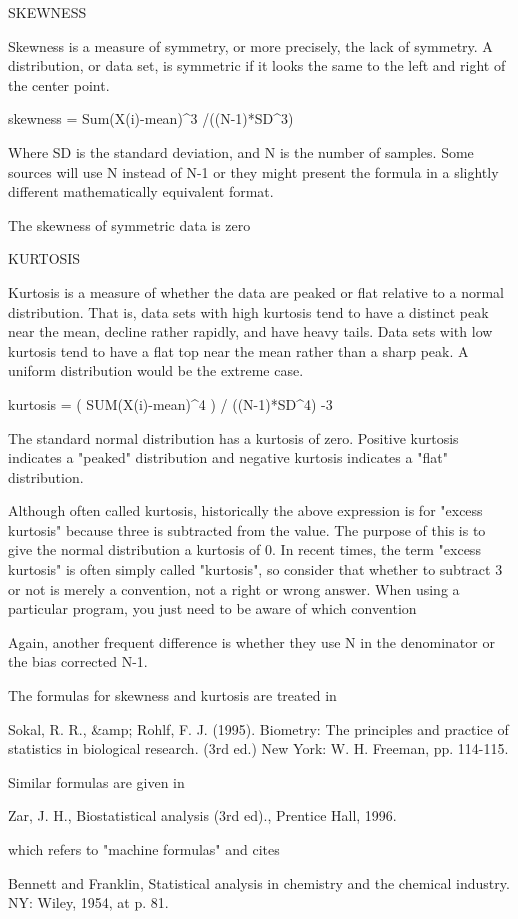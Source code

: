 S\+K\+E\+W\+N\+E\+SS \begin{DoxyVerb}   Skewness is a measure of symmetry, or more
   precisely, the lack of symmetry. A distribution, or
   data set, is symmetric if it looks the same to the left
   and right of the center point.

      skewness = Sum{(X(i)-mean)^3} /((N-1)*SD^3)

   Where SD is the standard deviation, and N is the number of
   samples. Some sources will use N instead of N-1 or they might
   present the formula in a slightly different mathematically
   equivalent format.

      The skewness of symmetric data is zero
\end{DoxyVerb}


K\+U\+R\+T\+O\+S\+IS \begin{DoxyVerb}   Kurtosis is a measure of whether the data are peaked
   or flat relative to a normal distribution. That is,
   data sets with high kurtosis tend to have a distinct
   peak near the mean, decline rather rapidly, and have
   heavy tails. Data sets with low kurtosis tend to have a
   flat top near the mean rather than a sharp peak. A
   uniform distribution would be the extreme case.

      kurtosis = ( SUM{(X(i)-mean)^4} ) / ((N-1)*SD^4) -3

   The standard normal distribution has a kurtosis of
   zero. Positive kurtosis indicates a "peaked"
   distribution and negative kurtosis indicates a "flat"
   distribution.

 Although often called kurtosis, historically the above expression is
 for "excess kurtosis" because three is subtracted from the value.
 The purpose of this is to give the normal distribution a kurtosis
 of 0. In recent times, the term "excess kurtosis" is often simply
 called "kurtosis", so consider that whether to subtract 3 or not
 is merely a convention, not a right or wrong answer. When using a
 particular program, you just need to be aware of which convention

 Again, another frequent difference is whether they use N in
 the denominator or the bias corrected N-1.

 The formulas for skewness and kurtosis are treated in

    Sokal, R. R., &amp; Rohlf, F. J. (1995).
    Biometry: The principles and practice of statistics in biological
    research. (3rd ed.) New York: W. H. Freeman, pp. 114-115.

 Similar formulas are given in

    Zar, J. H., Biostatistical analysis (3rd ed)., Prentice
    Hall, 1996.

 which refers to "machine formulas" and cites

    Bennett and Franklin, Statistical analysis in chemistry and
    the chemical industry. NY: Wiley, 1954, at p. 81.
\end{DoxyVerb}
